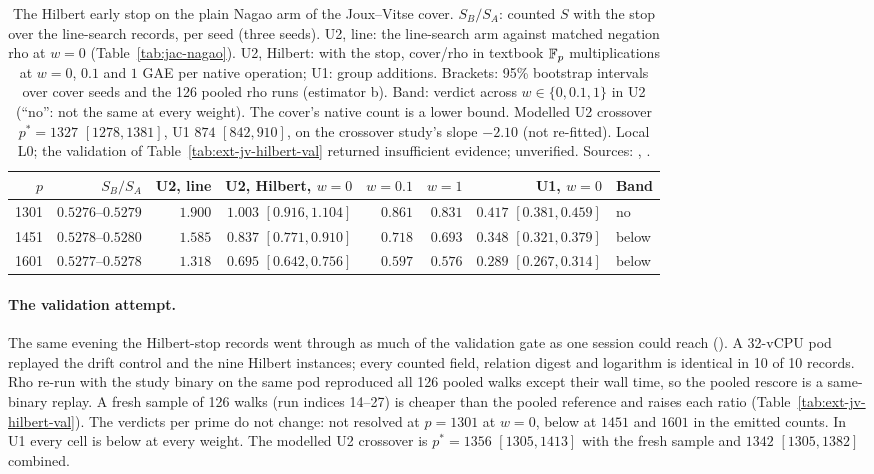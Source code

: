 \begin{table}[t]
\centering\small
\setlength{\tabcolsep}{4pt}
\begin{tabular}{@{}rrrrrrrl@{}}
\toprule
$p$ & $S_B/S_A$ & U2, line & U2, Hilbert, $w=0$ & $w=0.1$ & $w=1$ & U1, $w=0$ & Band \\
\midrule
1301 & $0.5276$--$0.5279$ & $1.900$ & $1.003$ $[0.916,1.104]$ & $0.861$ & $0.831$ & $0.417$ $[0.381,0.459]$ & no \\
1451 & $0.5278$--$0.5280$ & $1.585$ & $0.837$ $[0.771,0.910]$ & $0.718$ & $0.693$ & $0.348$ $[0.321,0.379]$ & below \\
1601 & $0.5277$--$0.5278$ & $1.318$ & $0.695$ $[0.642,0.756]$ & $0.597$ & $0.576$ & $0.289$ $[0.267,0.314]$ & below \\
\bottomrule
\end{tabular}
\caption[]{The Hilbert early stop on the plain Nagao arm of the
Joux--Vitse cover. $S_B/S_A$: counted $S$ with the stop over the
line-search records, per seed (three seeds). U2, line: the line-search arm
against matched negation rho at $w=0$
(Table~\ref{tab:jac-nagao}). U2, Hilbert: with the stop, cover/rho in
textbook $\mathbb{F}_p$ multiplications at $w=0$, $0.1$ and $1$ GAE per native
operation; U1: group additions. Brackets: 95\% bootstrap intervals over
cover seeds and the 126 pooled rho runs (estimator b). Band: verdict
across $w\in\{0,0.1,1\}$ in U2 (``no'': not the same at every weight).
The cover's native count is a lower bound. Modelled U2 crossover
$p^*=1327$ $[1278,1381]$, U1 $874$ $[842,910]$, on the crossover study's
slope $-2.10$ (not re-fitted). Local L0; the validation of
Table~\ref{tab:ext-jv-hilbert-val} returned insufficient evidence; unverified.
Sources: ,
.}
\label{tab:ext-jv-hilbert}
\end{table}

\paragraph{The validation attempt.} The same evening the Hilbert-stop
records went through as much of the validation gate as one session could
reach (). A
32-vCPU pod replayed the drift control and the nine Hilbert instances; every
counted field, relation digest and logarithm is identical in 10 of 10
records. Rho re-run with the study binary on the same pod reproduced all
126 pooled walks except their wall time, so the pooled rescore is a
same-binary replay. A fresh sample of 126 walks (run indices 14--27) is
cheaper than the pooled reference and raises each ratio
(Table~\ref{tab:ext-jv-hilbert-val}). The verdicts per prime do not change:
not resolved at $p=1301$ at $w=0$, below at $1451$ and $1601$ in the
emitted counts. In U1 every cell is below at every weight. The modelled U2
crossover is $p^*=1356$ $[1305,1413]$ with the fresh sample and $1342$
$[1305,1382]$ combined.

